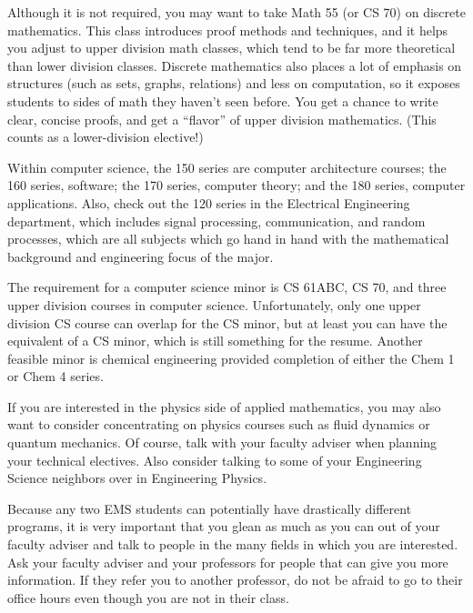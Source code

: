 Although it is not required, you may want to take Math 55 (or CS 70) on discrete mathematics. This class introduces proof methods and techniques, and it helps you adjust to upper division math classes, which tend to be far more theoretical than lower division classes. Discrete mathematics also places a lot of emphasis on structures (such as sets, graphs, relations) and less on computation, so it exposes students to sides of math they haven't seen before. You get a chance to write clear, concise proofs, and get a “flavor” of upper division mathematics. (This counts as a lower-division elective!)

Within computer science, the 150 series are computer architecture courses; the 160 series, software; the 170 series, computer theory; and the 180 series, computer applications. 
Also, check out the 120 series in the Electrical Engineering department, which includes signal processing, communication, and random processes, which are all subjects which go hand in hand with the mathematical background and engineering focus of the major.

The requirement for a computer science minor is CS 61ABC, CS 70, and three upper division courses in computer science.
Unfortunately, only one upper division CS course can overlap for the CS minor, but at least you can have the equivalent of a CS minor, which is still something for the resume. Another feasible minor is chemical engineering provided completion of either the Chem 1 or Chem 4 series.

If you are interested in the physics side of applied mathematics, you may also want to consider concentrating on physics courses such as fluid dynamics or quantum mechanics. Of course, talk with your faculty adviser when planning your technical electives.  Also consider talking to some of your Engineering Science neighbors over in Engineering Physics.

Because any two EMS students can potentially have drastically different programs, it is very important that you glean as much as you can out of your faculty adviser and talk to people in the many fields in which you are interested. Ask your faculty adviser and your professors for people that can give you more information. If they refer you to another professor, do not be afraid to go to their office hours even though you are not in their class.

